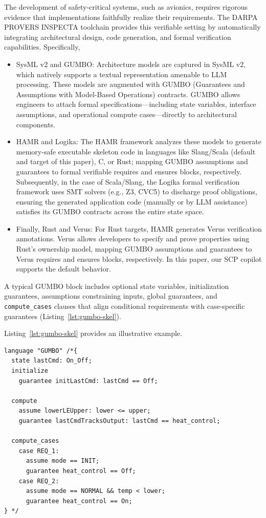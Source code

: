 \documentclass[conference]{IEEEtran}
\begin{document}
The development of safety-critical systems, such as avionics, requires rigorous evidence that implementations faithfully realize their requirements. The DARPA PROVERS INSPECTA toolchain provides this verifiable setting by automatically integrating architectural design, code generation, and formal verification capabilities. Specifically, 
\begin{itemize}
\item SysML v2 and GUMBO: Architecture models are captured in SysML v2, which natively supports a textual representation amenable to LLM processing. These models are augmented with GUMBO (Guarantees and Assumptions with Model-Based Operations) contracts. GUMBO allows engineers to attach formal specifications—including state variables, interface assumptions, and operational compute cases—directly to architectural components.

\item HAMR and Logika: The HAMR framework analyzes these models to generate memory-safe executable skeleton code in languages like Slang/Scala (default and target of this paper), C, or Rust; mapping GUMBO assumptions and guarantees to formal verifiable requires and ensures blocks, respectively. Subsequently, in the case of Scala/Slang, the Logika formal verification framework uses SMT solvers (e.g., Z3, CVC5) to discharge proof obligations, ensuring the generated application code (manually or by LLM assistance) satisfies its GUMBO contracts across the entire state space.

\item Finally, Rust and Verus: For Rust targets, HAMR generates Verus verification annotations. Verus allows developers to specify and prove properties using Rust’s ownership model, mapping GUMBO assumptions and guarantees to Verus requires and ensures blocks, respectively. In this paper, our SCP copilot supports the default behavior. 
\end{itemize}
A typical GUMBO block includes optional state variables, initialization guarantees, assumptions constraining inputs, global guarantees, and \texttt{compute\_cases} clauses that align conditional requirements with case-specific guarantees (Listing~\ref{lst:gumbo-skel}).

Listing~\ref{lst:gumbo-skel} provides an illustrative example.

\begin{lstlisting}[caption={Illustrative skeleton of a SysML v2 component with a GUMBO contract.},label={lst:gumbo-skel}]
language "GUMBO" /*{
  state lastCmd: On_Off;
  initialize
    guarantee initLastCmd: lastCmd == Off;

  compute
    assume lowerLEUpper: lower <= upper;
    guarantee lastCmdTracksOutput: lastCmd == heat_control;

  compute_cases
    case REQ_1:
      assume mode == INIT;
      guarantee heat_control == Off;
    case REQ_2:
      assume mode == NORMAL && temp < lower;
      guarantee heat_control == On;
} */
\end{lstlisting}
\end{document}
